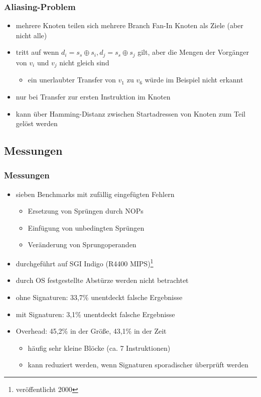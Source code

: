 \documentclass[mathserif,slidestop,compress,red]{beamer}
\begin{document}
\begin{frame}
  \frametitle{Aliasing-Problem}
  \begin{itemize}
    \item mehrere Knoten teilen sich mehrere Branch Fan-In Knoten als Ziele (aber nicht alle)
    \item tritt auf wenn $d_i = s_s \oplus s_i, d_j = s_s \oplus s_j$ gilt, aber die Mengen der
    Vorgänger von $v_i$ und $v_j$ nicht gleich sind
    \begin{itemize}
      \item ein unerlaubter Transfer von $v_1$ zu $v_6$ würde im Beispiel nicht erkannt
    \end{itemize}
    \pause
    \item nur bei Transfer zur ersten Instruktion im Knoten
    \item kann über Hamming-Distanz zwischen Startadressen von Knoten zum Teil gelöst werden
  \end{itemize}
\end{frame}

\subsection{Messungen}

\begin{frame}
  \frametitle{Messungen}
  \begin{itemize}
    \item sieben Benchmarks mit zufällig eingefügten Fehlern
    \begin{itemize}
      \item Ersetzung von Sprüngen durch NOPs
      \item Einfügung von unbedingten Sprüngen
      \item Veränderung von Sprungoperanden
    \end{itemize}
    \item durchgeführt auf SGI Indigo (R4400 MIPS)\footnote{veröffentlicht 2000}
    \item durch OS festgestellte Abstürze werden nicht betrachtet
    \item ohne Signaturen: 33,7\% unentdeckt falsche Ergebnisse
    \item mit Signaturen: 3,1\% unentdeckt falsche Ergebnisse
    \item Overhead: 45,2\% in der Größe, 43,1\% in der Zeit
    \begin{itemize}
      \item häufig sehr kleine Blöcke (ca. 7 Instruktionen)
      \item kann reduziert werden, wenn Signaturen sporadischer überprüft werden
    \end{itemize}
  \end{itemize}
\end{frame}
\end{document}
